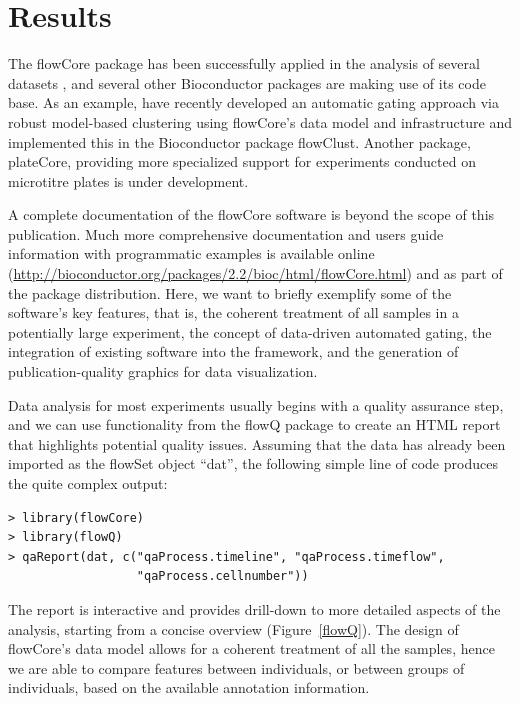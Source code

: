 \documentclass[12pt]{article}
\begin{document}
\section*{Results}

The flowCore package has been successfully applied in the analysis of
several datasets \citep{gasparetto2004ice,brinkman2007hcf}, and
several other Bioconductor packages are making use of its code
base. As an example, \cite{lo2008agf} have recently developed an
automatic gating approach via robust model-based clustering using
flowCore's data model and infrastructure and implemented this in the
Bioconductor package flowClust. Another package, plateCore, providing
more specialized support for experiments conducted on microtitre
plates is under development.

A complete documentation of the flowCore software is beyond the scope
of this publication.  Much more comprehensive documentation and users
guide information with programmatic examples is available online
(\url{http://bioconductor.org/packages/2.2/bioc/html/flowCore.html})
and as part of the package distribution. Here, we want to briefly
exemplify some of the software's key features, that is, the coherent
treatment of all samples in a potentially large experiment, the
concept of data-driven automated gating, the integration of existing
software into the framework, and the generation of publication-quality
graphics for data visualization.

Data analysis for most experiments usually begins with a quality
assurance step, and we can use functionality from the flowQ package to
create an HTML report that highlights potential quality
issues. Assuming that the data has already been imported as the
flowSet object ``dat'', the following simple line of code produces the
quite complex output:

\begin{verbatim}
> library(flowCore)
> library(flowQ)
> qaReport(dat, c("qaProcess.timeline", "qaProcess.timeflow", 
                  "qaProcess.cellnumber"))
\end{verbatim}

The report is interactive and provides drill-down to more detailed
aspects of the analysis, starting from a concise overview
(Figure~\ref{flowQ}). The design of flowCore's data model allows for a
coherent treatment of all the samples, hence we are able to compare
features between individuals, or between groups of individuals, based
on the available annotation information.
\end{document}
